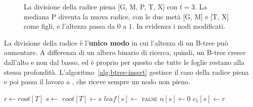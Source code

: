\begin{figure}[htbp]
\centering
{}
\caption{La divisione della radice piena [G, M, P, T, X] con $t = 3$. La mediana P diventa la nuova radice, con le due metà [G, M] e [T, X] come figli, e l'altezza passa da $0$ a $1$. In evidenza i nodi modificati.}
\label{fig:root-split}
\end{figure}

La divisione della radice è l'\textbf{unico modo} in cui l'altezza di un B-tree può aumentare. A differenza di un albero binario di ricerca, quindi, un B-tree cresce dall'alto e non dal basso, ed è proprio per questo che tutte le foglie restano alla stessa profondità. L'algoritmo~\ref{alg:btree-insert} gestisce il caso della radice piena e poi passa il lavoro a \BTreeInsertNonfull{}, che riceve sempre un nodo non pieno.

\begin{algorithm}[htbp]
\caption{L'inserimento della chiave $k$ nel B-tree $T$. Se la radice è piena, viene prima divisa sotto una nuova radice $s$.}\label{alg:btree-insert}
\begin{algorithmic}[1]
  \State $r \gets \mathit{root}[T]$
    \State $s \gets$ 
    \State $\mathit{root}[T] \gets s$
    \State $\mathit{leaf}[s] \gets$ \textsc{false}
    \State $n[s] \gets 0$
    \State $c_1[s] \gets r$
    \State {}
    \State {}
  \Else
    \State {}
  \EndIf
\EndProcedure
\end{algorithmic}
\end{algorithm}

